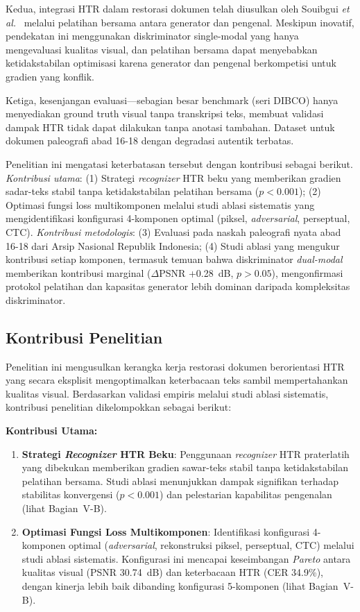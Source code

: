 \documentclass[journal]{IEEEtran}
\begin{document}
Kedua, integrasi HTR dalam restorasi dokumen telah diusulkan oleh Souibgui \textit{et al.}~\cite{souibgui2021enhance} melalui pelatihan bersama antara generator dan pengenal. Meskipun inovatif, pendekatan ini menggunakan diskriminator single-modal yang hanya mengevaluasi kualitas visual, dan pelatihan bersama dapat menyebabkan ketidakstabilan optimisasi karena generator dan pengenal berkompetisi untuk gradien yang konflik.

Ketiga, kesenjangan evaluasi—sebagian besar benchmark (seri DIBCO) hanya menyediakan ground truth visual tanpa transkripsi teks, membuat validasi dampak HTR tidak dapat dilakukan tanpa anotasi tambahan. Dataset untuk dokumen paleografi abad 16-18 dengan degradasi autentik terbatas.

Penelitian ini mengatasi keterbatasan tersebut dengan kontribusi sebagai berikut. \textit{Kontribusi utama}: (1) Strategi \textit{recognizer} HTR beku yang memberikan gradien sadar-teks stabil tanpa ketidakstabilan pelatihan bersama ($p<0.001$); (2) Optimasi fungsi loss multikomponen melalui studi ablasi sistematis yang mengidentifikasi konfigurasi 4-komponen optimal (piksel, \textit{adversarial}, perseptual, CTC). \textit{Kontribusi metodologis}: (3) Evaluasi pada naskah paleografi nyata abad 16-18 dari Arsip Nasional Republik Indonesia; (4) Studi ablasi yang mengukur kontribusi setiap komponen, termasuk temuan bahwa diskriminator \textit{dual-modal} memberikan kontribusi marginal ($\Delta$PSNR +0.28~dB, $p>0.05$), mengonfirmasi protokol pelatihan dan kapasitas generator lebih dominan daripada kompleksitas diskriminator.

\subsection{Kontribusi Penelitian}

Penelitian ini mengusulkan kerangka kerja restorasi dokumen berorientasi HTR yang secara eksplisit mengoptimalkan keterbacaan teks sambil mempertahankan kualitas visual. Berdasarkan validasi empiris melalui studi ablasi sistematis, kontribusi penelitian dikelompokkan sebagai berikut:

\textbf{Kontribusi Utama:}
\begin{enumerate}
    \item \textbf{Strategi \textit{Recognizer} HTR Beku}: Penggunaan \textit{recognizer} HTR praterlatih yang dibekukan memberikan gradien sawar-teks stabil tanpa ketidakstabilan pelatihan bersama. Studi ablasi menunjukkan dampak signifikan terhadap stabilitas konvergensi ($p<0.001$) dan pelestarian kapabilitas pengenalan (lihat Bagian~V-B).
    
    \item \textbf{Optimasi Fungsi Loss Multikomponen}: Identifikasi konfigurasi 4-komponen optimal (\textit{adversarial}, rekonstruksi piksel, perseptual, CTC) melalui studi ablasi sistematis. Konfigurasi ini mencapai keseimbangan \textit{Pareto} antara kualitas visual (PSNR 30.74~dB) dan keterbacaan HTR (CER 34.9\%), dengan kinerja lebih baik dibanding konfigurasi 5-komponen (lihat Bagian~V-B).
\end{enumerate}
\end{document}
